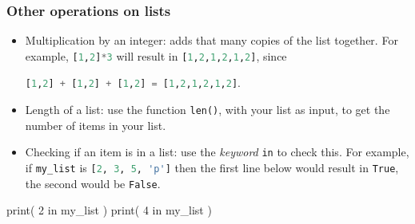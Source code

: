 \documentclass{beamer}
\newenvironment{codeblock}
    {\hfill\begin{beamerboxesrounded}[lower=codecol, width=0.8\textwidth]
    \medskip

    }
    { 
    \end{beamerboxesrounded}\hfill
    }
\theoremstyle{example}
\newcommand{\ct}[1]{\lstinline[language=Python]!#1!}
\newcommand{\ttt}[1]{{\small\texttt{#1}}}
\newcommand{\comment}[1]{}
\begin{document}
\begin{frame}[fragile]
\frametitle{Other operations on lists}

\begin{itemize}
	\item Multiplication by an integer: adds that many copies of the list together. For example, \ct{[1,2]*3} will result in \ct{[1,2,1,2,1,2]}, since 
	\begin{center}\ct{[1,2] + [1,2] + [1,2] = [1,2,1,2,1,2]}.
	\end{center}
	\item Length of a list: use the function \ttt{len()}, with your list as input, to get the number of items in your list.
	\item Checking if an item is in a list: use the \emph{keyword} \ttt{in} to check this. For example, if \ttt{my}\ct{_}\ttt{list} is \ct{[2, 3, 5, 'p']} then the first line below would result in \ttt{True}, the second would be \ttt{False}.
\end{itemize}

\begin{codeblock}

\begin{python}
print( 2 in my_list )
print( 4 in my_list )
\end{python}

\end{codeblock}

\end{frame}

\comment{
\begin{frame}
\frametitle{Strings and other sequential types}

\begin{itemize}
	\item Some other sequential types: {\ttb tuple}, {\ttb range}.
	\item The operations we discussed (on lists) will work in same way on these.

	\item Final important sequential type: {\ttb str}, ``strings.''
	\begin{itemize}
		\item a sequence of \emph{characters}, from your keyboard
	\end{itemize}
	\item Above, the variable that was assigned \ttt{'Chris Cornwell'}, and the item \ttt{'p'} in \ttt{my}\ct{_}\ttt{list}, each is a string.
	\item \emph{Thinking} of a string as a list of single characters, operations on strings work like they do on lists (e.g., \ttt{+} will concatenate and \ttt{len()} gives the number of characters, etc. 
\end{itemize}
\end{frame}
}
\end{document}

